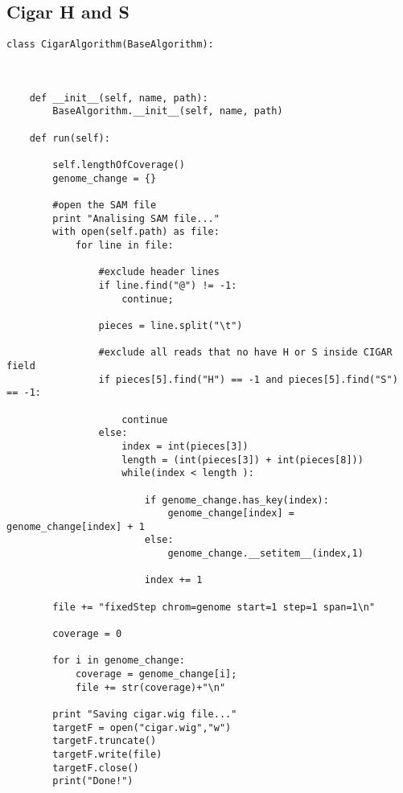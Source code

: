 \subsection{Cigar H and S}
\tiny
\begin{verbatim}
class CigarAlgorithm(BaseAlgorithm):



    def __init__(self, name, path):
        BaseAlgorithm.__init__(self, name, path)

    def run(self):

        self.lengthOfCoverage()
        genome_change = {}

        #open the SAM file
        print "Analising SAM file..."
        with open(self.path) as file:
            for line in file:

                #exclude header lines
                if line.find("@") != -1:
                    continue;

                pieces = line.split("\t")

                #exclude all reads that no have H or S inside CIGAR field
                if pieces[5].find("H") == -1 and pieces[5].find("S") == -1:

                    continue
                else:
                    index = int(pieces[3])
                    length = (int(pieces[3]) + int(pieces[8]))
                    while(index < length ):

                        if genome_change.has_key(index):
                            genome_change[index] = genome_change[index] + 1
                        else:
                            genome_change.__setitem__(index,1)

                        index += 1

        file += "fixedStep chrom=genome start=1 step=1 span=1\n"

        coverage = 0

        for i in genome_change:
            coverage = genome_change[i];
            file += str(coverage)+"\n"

        print "Saving cigar.wig file..."
        targetF = open("cigar.wig","w")
        targetF.truncate()
        targetF.write(file)
        targetF.close()
        print("Done!")
\end{verbatim}        
\newpage
